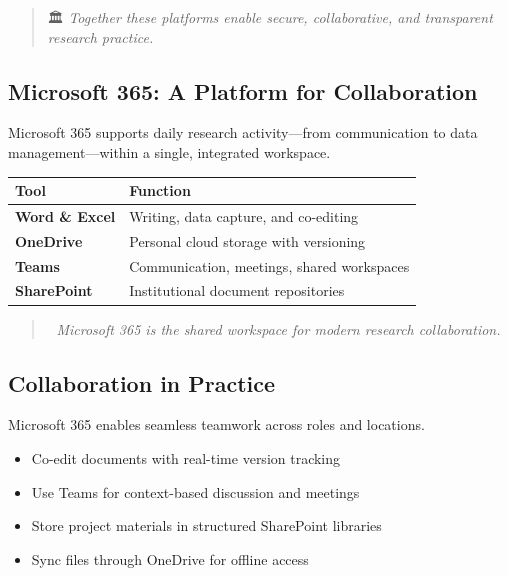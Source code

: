 \documentclass[
  letterpaper,
  DIV=11,
  numbers=noendperiod]{scrartcl}
\providecommand{\tightlist}{%
  \setlength{\itemsep}{0pt}\setlength{\parskip}{0pt}}
\begin{document}
\begin{quote}
🏛️ \emph{Together these platforms enable secure, collaborative, and
transparent research practice.}
\end{quote}

\subsection{Microsoft 365: A Platform for
Collaboration}\label{microsoft-365-a-platform-for-collaboration}

Microsoft 365 supports daily research activity---from communication to
data management---within a single, integrated workspace.

\begin{longtable}[]{@{}ll@{}}
\toprule\noalign{}
\textbf{Tool} & \textbf{Function} \\
\midrule\noalign{}
\endhead
\bottomrule\noalign{}
\endlastfoot
\textbf{Word \& Excel} & Writing, data capture, and co-editing \\
\textbf{OneDrive} & Personal cloud storage with versioning \\
\textbf{Teams} & Communication, meetings, shared workspaces \\
\textbf{SharePoint} & Institutional document repositories \\
\end{longtable}

\begin{quote}
💬 \emph{Microsoft 365 is the shared workspace for modern research
collaboration.}
\end{quote}

\subsection{Collaboration in Practice}\label{collaboration-in-practice}

Microsoft 365 enables seamless teamwork across roles and locations.

\begin{itemize}
\tightlist
\item
  Co-edit documents with real-time version tracking\\
\item
  Use Teams for context-based discussion and meetings\\
\item
  Store project materials in structured SharePoint libraries\\
\item
  Sync files through OneDrive for offline access
\end{itemize}
\end{document}
